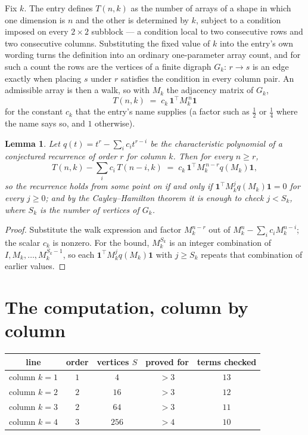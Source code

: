 \documentclass[11pt,a4paper]{article}
\theoremstyle{plain}
\newtheorem{lemma}[theorem]{Lemma}
\theoremstyle{definition}
\begin{document}
Fix $k$. The entry defines $T(n,k)$ as the number of arrays of a shape in which one dimension
is $n$ and the other is determined by $k$, subject to a condition imposed on every
$2\times2$ subblock --- a condition local to two consecutive rows and two consecutive columns.
Substituting the fixed value of $k$ into the entry's own wording turns the definition into an
ordinary one-parameter array count, and for such a count the rows are the vertices of a finite
digraph $G_k$: $r\to s$ is an edge exactly when placing $s$ under $r$ satisfies the condition
in every column pair. An admissible array is then a walk, so with $M_k$ the adjacency matrix
of $G_k$,
\[
T(n,k)\;=\;c_k\,\mathbf{1}^{\!\top}M_k^{\,n}\mathbf{1}
\]
for the constant $c_k$ that the entry's name supplies (a factor such as $\tfrac12$ or
$\tfrac14$ where the name says so, and $1$ otherwise).

\begin{lemma}\label{lem:crit}
Let $q(t)=t^{r}-\sum_i c_it^{r-i}$ be the characteristic polynomial of a conjectured
recurrence of order $r$ for column $k$. Then for every $n\ge r$,
\[
T(n,k)-\sum_i c_i\,T(n-i,k)\;=\;c_k\,\mathbf{1}^{\!\top}M_k^{\,n-r}q(M_k)\mathbf{1},
\]
so the recurrence holds from some point on if and only if
$\mathbf{1}^{\!\top}M_k^{j}q(M_k)\mathbf{1}=0$ for every $j\ge0$; and by the
Cayley--Hamilton theorem it is enough to check $j<S_k$, where $S_k$ is the number of vertices
of $G_k$.
\end{lemma}

\begin{proof}
Substitute the walk expression and factor $M_k^{n-r}$ out of $M_k^{n}-\sum_ic_iM_k^{n-i}$;
the scalar $c_k$ is nonzero. For the bound, $M_k^{S_k}$ is an integer combination of
$I,M_k,\dots,M_k^{S_k-1}$, so each $\mathbf{1}^{\!\top}M_k^{j}q(M_k)\mathbf{1}$ with
$j\ge S_k$ repeats that combination of earlier values.
\end{proof}

\section{The computation, column by column}

\begin{center}
\begin{tabular}{ccccc}
line & order & vertices $S$ & proved for & terms checked \\ \hline
column $k$$=1$ & $1$ & $4$ & $>3$ & $13$ \\
column $k$$=2$ & $2$ & $16$ & $>3$ & $12$ \\
column $k$$=3$ & $2$ & $64$ & $>3$ & $11$ \\
column $k$$=4$ & $3$ & $256$ & $>4$ & $10$ \\
\end{tabular}
\end{center}
\end{document}
